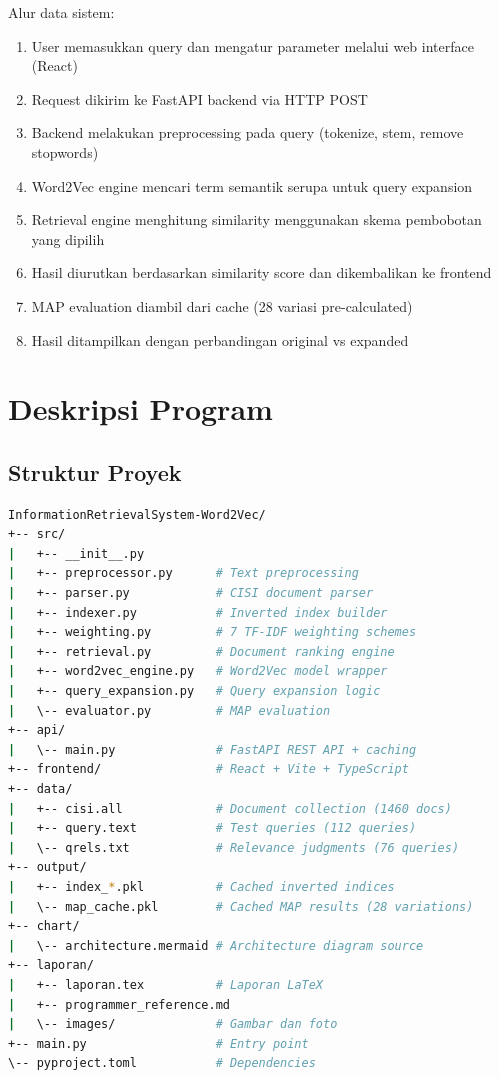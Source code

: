 \documentclass[12pt,a4paper]{report}
\begin{document}
Alur data sistem:
\begin{enumerate}
    \item User memasukkan query dan mengatur parameter melalui web interface (React)
    \item Request dikirim ke FastAPI backend via HTTP POST
    \item Backend melakukan preprocessing pada query (tokenize, stem, remove stopwords)
    \item Word2Vec engine mencari term semantik serupa untuk query expansion
    \item Retrieval engine menghitung similarity menggunakan skema pembobotan yang dipilih
    \item Hasil diurutkan berdasarkan similarity score dan dikembalikan ke frontend
    \item MAP evaluation diambil dari cache (28 variasi pre-calculated)
    \item Hasil ditampilkan dengan perbandingan original vs expanded
\end{enumerate}

\chapter{Deskripsi Program}

\section{Struktur Proyek}
\begin{lstlisting}[language=bash, caption=Struktur Direktori]
InformationRetrievalSystem-Word2Vec/
+-- src/
|   +-- __init__.py
|   +-- preprocessor.py      # Text preprocessing
|   +-- parser.py            # CISI document parser
|   +-- indexer.py           # Inverted index builder
|   +-- weighting.py         # 7 TF-IDF weighting schemes
|   +-- retrieval.py         # Document ranking engine
|   +-- word2vec_engine.py   # Word2Vec model wrapper
|   +-- query_expansion.py   # Query expansion logic
|   \-- evaluator.py         # MAP evaluation
+-- api/
|   \-- main.py              # FastAPI REST API + caching
+-- frontend/                # React + Vite + TypeScript
+-- data/
|   +-- cisi.all             # Document collection (1460 docs)
|   +-- query.text           # Test queries (112 queries)
|   \-- qrels.txt            # Relevance judgments (76 queries)
+-- output/
|   +-- index_*.pkl          # Cached inverted indices
|   \-- map_cache.pkl        # Cached MAP results (28 variations)
+-- chart/
|   \-- architecture.mermaid # Architecture diagram source
+-- laporan/
|   +-- laporan.tex          # Laporan LaTeX
|   +-- programmer_reference.md
|   \-- images/              # Gambar dan foto
+-- main.py                  # Entry point
\-- pyproject.toml           # Dependencies
\end{lstlisting}
\end{document}
